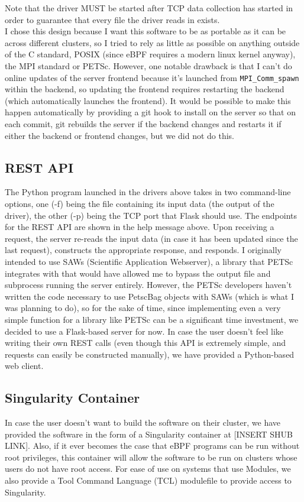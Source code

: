 Note that the driver MUST be started after TCP data collection has started in order to guarantee that every file the driver reads in exists.\\
I chose this design because I want this software to be as portable as it can be across different clusters, so I tried to rely as little as possible on anything outside of the C standard, POSIX (since eBPF requires a modern linux kernel anyway), the MPI standard or PETSc. However, one notable drawback is that I can't do online updates of the server frontend because it's launched from \lstinline{MPI_Comm_spawn} within the backend, so updating the frontend requires restarting the backend (which automatically launches the frontend). It would be possible to make this happen automatically by providing a git hook to install on the server so that on each commit, git rebuilds the server if the backend changes and restarts it if either the backend or frontend changes, but we did not do this.
\subsection*{REST API}
The Python program launched in the drivers above takes in two command-line options, one (-f) being the file containing its input data (the output of the driver), the other (-p) being the TCP port that Flask should use.
The endpoints for the REST API are shown in the help message above. Upon receiving a request, the server re-reads the input data (in case it has been updated since the last request), constructs the appropriate response, and responds. I originally intended to use SAWs (Scientific Application Webserver), a library that PETSc integrates with that would have allowed me to bypass the output file and subprocess running the server entirely. However, the PETSc developers haven't written the code necessary to use PetscBag objects with SAWs (which is what I was planning to do), so for the sake of time, since implementing even a very simple function for a library like PETSc can be a significant time investment, we decided to use a Flask-based server for now. In case the user doesn't feel like writing their own REST calls (even though this API is extremely simple, and requests can easily be constructed manually), we have provided a Python-based web client.
\subsection*{Singularity Container}
In case the user doesn't want to build the software on their cluster, we have provided the software in the form of a Singularity container at [INSERT SHUB LINK]. Also, if it ever becomes the case that eBPF programs can be run without root privileges, this container will allow the software to be run on clusters whose users do not have root access. For ease of use on systems that use Modules, we also provide a Tool Command Language (TCL) modulefile to provide access to Singularity.

